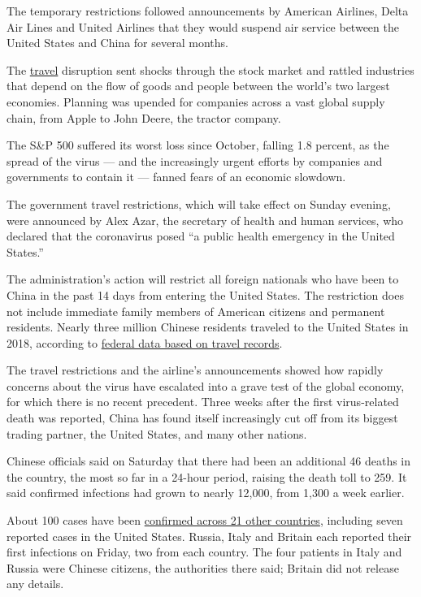 The temporary restrictions followed announcements by American Airlines,
Delta Air Lines and United Airlines that they would suspend air service
between the United States and China for several months.

The
\href{https://www.nytimes.com/2020/02/10/business/china-coronavirus-philippines-travel.html}{travel}
disruption sent shocks through the stock market and rattled industries
that depend on the flow of goods and people between the world's two
largest economies. Planning was upended for companies across a vast
global supply chain, from Apple to John Deere, the tractor company.

The S\&P 500 suffered its worst loss since October, falling 1.8 percent,
as the spread of the virus --- and the increasingly urgent efforts by
companies and governments to contain it --- fanned fears of an economic
slowdown.

The government travel restrictions, which will take effect on Sunday
evening, were announced by Alex Azar, the secretary of health and human
services, who declared that the coronavirus posed ``a public health
emergency in the United States.''

The administration's action will restrict all foreign nationals who have
been to China in the past 14 days from entering the United States. The
restriction does not include immediate family members of American
citizens and permanent residents. Nearly three million Chinese residents
traveled to the United States in 2018, according to
\href{https://travel.trade.gov/view/m-2017-I-001/index.asp}{federal data
based on travel records}.

The travel restrictions and the airline's announcements showed how
rapidly concerns about the virus have escalated into a grave test of the
global economy, for which there is no recent precedent. Three weeks
after the first virus-related death was reported, China has found itself
increasingly cut off from its biggest trading partner, the United
States, and many other nations.

Chinese officials said on Saturday that there had been an additional 46
deaths in the country, the most so far in a 24-hour period, raising the
death toll to 259. It said confirmed infections had grown to nearly
12,000, from 1,300 a week earlier.

About 100 cases have been
\href{https://www.nytimes.com/2020/02/01/nyregion/coronavirus-new-york-city.html}{confirmed
across 21 other countries}, including seven reported cases in the United
States. Russia, Italy and Britain each reported their first infections
on Friday, two from each country. The four patients in Italy and Russia
were Chinese citizens, the authorities there said; Britain did not
release any details.

